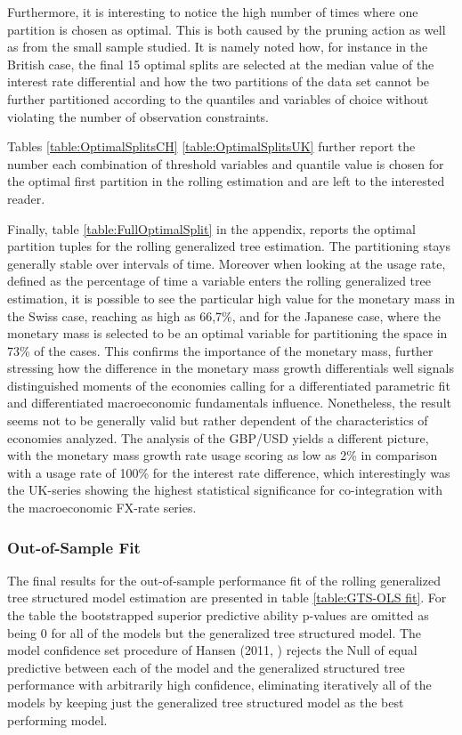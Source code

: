 Furthermore, it is interesting to notice the high number of times
where one partition is chosen as optimal. This is both caused by the
pruning action as well as from the small sample studied. It is namely
noted how, for instance in the British case, the final 15 optimal
splits are selected at the median value of the interest rate
differential and how the two partitions of the data set cannot be
further partitioned according to the quantiles and variables of choice
without violating the number of observation constraints.

Tables \ref{table:OptimalSplitsCH}\textendash
\ref{table:OptimalSplitsUK} further report the number each combination
of threshold variables and quantile value is chosen for the optimal
first partition in the rolling estimation and are left to the
interested reader.

Finally, table \ref{table:FullOptimalSplit} in the appendix, reports
the optimal partition tuples for the rolling generalized tree
estimation. The partitioning stays generally stable over intervals of
time. Moreover when looking at the usage rate, defined as the
percentage of time a variable enters the rolling generalized tree
estimation, it is possible to see the particular high value for the
monetary mass in the Swiss case, reaching as high as 66,7\%, and for
the Japanese case, where the monetary mass is selected to be an
optimal variable for partitioning the space in 73\% of the cases. This
confirms the importance of the monetary mass, further stressing how
the difference in the monetary mass growth differentials well signals
distinguished moments of the economies calling for a differentiated
parametric fit and differentiated macroeconomic fundamentals influence.
Nonetheless, the result seems not to be generally valid but rather
dependent of the characteristics of economies analyzed. The analysis
of the GBP/USD yields a different picture, with the monetary mass
growth rate usage scoring as low as 2\% in comparison with a usage
rate of 100\% for the interest rate difference, which interestingly
was the UK-series showing the highest statistical significance for
co-integration with the macroeconomic FX-rate series.

\subsubsection{Out-of-Sample Fit}

The final results for the out-of-sample performance fit of the rolling
generalized tree structured model estimation are presented in table
\ref{table:GTS-OLS fit}. For the table the bootstrapped superior
predictive ability p-values are omitted as being 0 for all of the
models but the generalized tree structured model. The model confidence
set procedure of Hansen (2011, \cite{HansenMCS}) rejects the Null of
equal predictive between each of the model and the generalized
structured tree performance with arbitrarily high confidence, eliminating
iteratively all of the models by keeping just the generalized tree
structured model as the best performing model.

